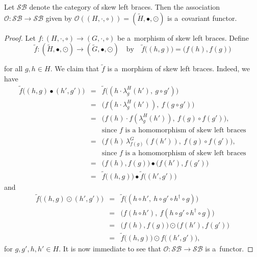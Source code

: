 \documentclass[10pt,a4paper]{amsart}
\begin{document}
	\begin{proposition}\label{sb iso to isb iso}
		Let $\mathcal{SB}$ denote the category of skew left braces. Then the association $\mathcal{O}: \mathcal{SB} \to \mathcal{SB}$ given by $\mathcal{O}((H,\cdot,\circ))= (\widetilde{H}, \bullet, \odot)$ is a~covariant functor.
	\end{proposition}

	\begin{proof}
		Let $f\colon (H,\cdot,\circ)\to(G,\cdot,\circ)$ be a~morphism of skew left braces. Define
		\[
		\tilde{f}: (\tilde{H},\bullet,\odot)\to (\tilde{G},\bullet,\odot)
		\quad \text{by} \quad \widetilde{f}\big((h,g)\big)=\big(f(h),f(g)\big)\] 
		
		for all $g, h \in H$. We claim that $\widetilde{f}$ is a~morphism of skew left braces. Indeed, we have
		\begin{eqnarray*}
			\widetilde{f} \big((h,g)\bullet(h',g') \big)&=&\widetilde{f} \big((h \cdot \lambda^H_g (h'),~g\circ g')\big)\\
			&=& \big(f(h \cdot \lambda^H_g (h')),~f(g\circ g')\big)\\
			&=& \big(f(h) \cdot f(\lambda^H_g (h')),~f(g)\circ f(g') \big),\\
			&&\text{since $f$ is a homomorphism of skew left braces}\\
			&=& \big(f(h)\, \lambda^G_{f(g)}(f(h')),~f(g)\circ f(g') \big),\\
			&&\text{since $f$ is a homomorphism of skew left braces}\\
			&=& \big(f(h),f(g) \big)\bullet \big(f(h'),f(g') \big)\\
			&=&\widetilde{f}\big((h,g)\big) \bullet \widetilde{f}\big((h',g')\big)
		\end{eqnarray*}
		and
		\begin{eqnarray*}
			\widetilde{f} \big((h,g)\odot (h',g') \big)&=&\widetilde{f} \big((h\circ h',~h\circ g'\circ h^\dagger\circ g)\big)\\
			&=&	\big(f(h\circ h'),~f(h\circ g'\circ h^\dagger\circ g) \big)\\
			&=& \big(f(h),f(g) \big)\odot \big(f(h'),f(g') \big)\\
			&=&\widetilde{f} \big((h,g)\big)\odot {f} \big((h',g')\big),
		\end{eqnarray*}
		for $g,g', h,h' \in H$. It is now immediate to see that $\mathcal{O}: \mathcal{SB} \to \mathcal{SB}$ is a~functor.
	\end{proof}
\end{document}
